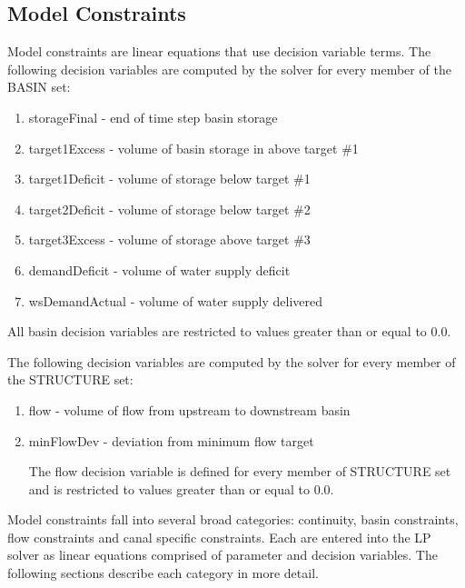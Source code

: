 \subsection{Model Constraints} 

Model constraints are linear equations that use decision variable
terms.  The following decision variables are computed by the solver
for every member of the BASIN set:

\begin{enumerate}
 
 \item storageFinal \-- end of time step basin storage 
 \item target1Excess \-- volume of basin storage in above target \#1
 \item target1Deficit \-- volume of storage below target \#1
 \item target2Deficit \-- volume of storage below target \#2
 \item target3Excess \-- volume of storage above target \#3
 \item demandDeficit \-- volume of water supply deficit
 \item wsDemandActual \-- volume of water supply delivered

\end{enumerate}

All basin decision variables are restricted to values greater than or
equal to 0.0.

The following decision variables are computed by the solver for every
member of the STRUCTURE set:

\begin{enumerate}
 
 \item flow \-- volume of flow from upstream to downstream basin
 \item minFlowDev \-- deviation from minimum flow target

The flow decision variable is defined for every member of STRUCTURE
set and is restricted to values greater than or equal to 0.0.

\end{enumerate}

Model constraints fall into several broad categories: continuity,
basin constraints, flow constraints and canal specific constraints.
Each are entered into the LP solver as linear equations comprised of
parameter and decision variables.  The following sections describe
each category in more detail.


